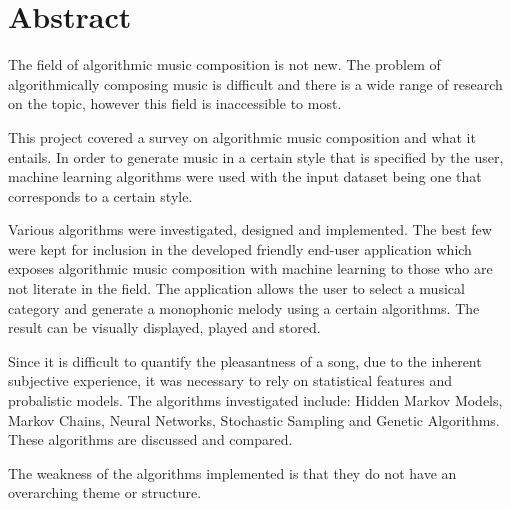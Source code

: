 \begingroup
\let\clearpage\relax
\let\cleardoublepage\relax
\let\cleardoublepage\relax

\chapter*{Abstract}
The field of algorithmic music composition is not new. The problem of algorithmically composing music is difficult and there is a wide range of research on the topic, however this field is inaccessible to most. 

This project covered a survey on algorithmic music composition and what it entails. In order to generate music in a certain style that is specified by the user, machine learning algorithms were used with the input dataset being one that corresponds to a certain style.

Various algorithms were investigated, designed and implemented. The best few were kept for inclusion in the developed friendly end-user application which exposes algorithmic music composition with machine learning to those who are not literate in the field. The application allows the user to select a musical category and generate a monophonic melody using a certain algorithms. The result can be visually displayed, played and stored.

Since it is difficult to quantify the pleasantness of a song, due to the inherent subjective experience, it was necessary to rely on statistical features and probalistic models. The algorithms investigated include: Hidden Markov Models, Markov Chains, Neural Networks, Stochastic Sampling and Genetic Algorithms. These algorithms are discussed and compared.

The weakness of the algorithms implemented is that they do not have an overarching theme or structure. 



\vfill



\endgroup			

\vfill